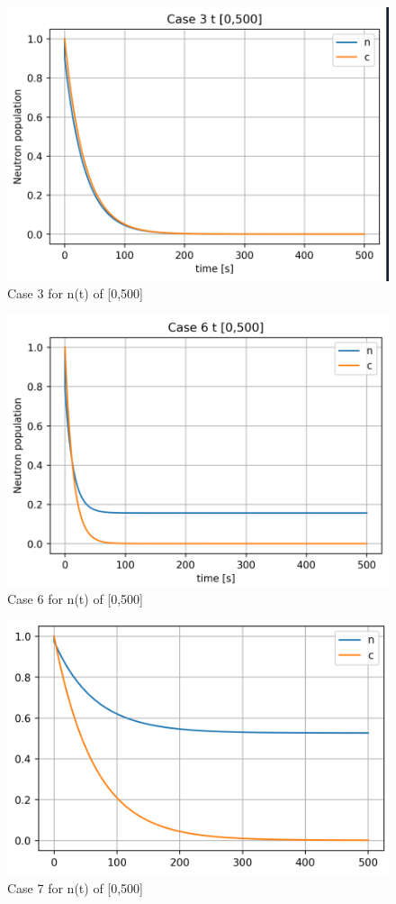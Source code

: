 \documentclass[12pt,fleqn, parskip=full]{scrartcl}
\begin{document}
\begin{figure}[H]
	\centering
	\includegraphics[scale=1]{Image_8_hw_4}
	\caption{Case 3 for n(t) of [0,500]}
\end{figure}

\begin{figure}[H]
	\centering
	\includegraphics[scale=1]{Image_9_hw_4}
	\caption{Case 6 for n(t) of [0,500]}
\end{figure}

\begin{figure}[H]
	\centering
	\includegraphics[scale=1]{Image_10_hw_4}
	\caption{Case 7 for n(t) of [0,500]}
\end{figure}
\end{document}

